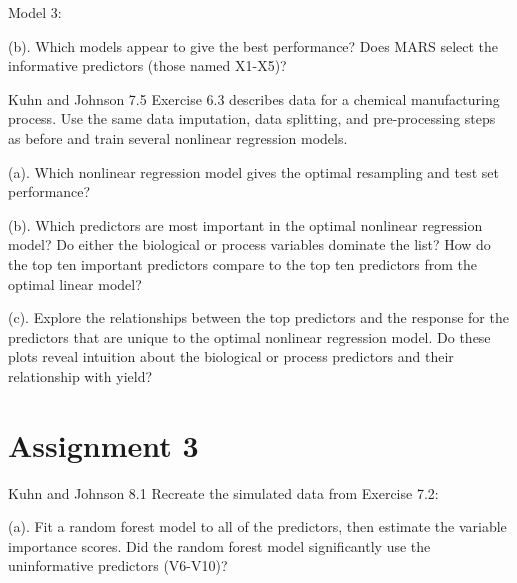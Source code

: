 \documentclass[]{report}
\begin{document}
Model 3:

\begin{subquestion}{(b).}
Which models appear to give the best performance? Does MARS select the informative predictors (those named X1-X5)?
\end{subquestion}


\begin{question}{Kuhn and Johnson 7.5}
Exercise 6.3 describes data for a chemical manufacturing process. Use the same data imputation, data splitting, and pre-processing steps as before and train several nonlinear regression models.
\end{question}

\begin{subquestion}{(a).}
Which nonlinear regression model gives the optimal resampling and test set performance? 
\end{subquestion}

\begin{subquestion}{(b).}
Which predictors are most important in the optimal nonlinear regression model? Do either the biological or process variables dominate the list? How do the top ten important predictors compare to the top ten predictors from the optimal linear model? 
\end{subquestion}

\begin{subquestion}{(c).}
Explore the relationships between the top predictors and the response for the predictors that are unique to the optimal nonlinear regression model. Do these plots reveal intuition about the biological or process predictors and their relationship with yield?
\end{subquestion}

\hypertarget{AS-3}{%
\chapter*{Assignment 3}\label{AS-3}}


\begin{question}{Kuhn and Johnson 8.1} Recreate the simulated data from Exercise 7.2: \end{question}

\begin{subquestion}{(a).} Fit a random forest model to all of the predictors, then estimate the variable importance scores. Did the random forest model significantly use the uninformative predictors (V6-V10)?\end{subquestion}
\end{document}
